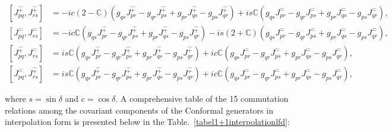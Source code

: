 \documentclass[%
 reprint,
superscriptaddress,
 amsmath,amssymb,
 aps,
]{revtex4-2}
\begin{document}
\begin{widetext}
\begin{center}
\begin{align}
    \left[J^{\hat{+}}_{pq},J^{\hat{+}}_{rs}\right] &=-ic(2-\mathbb{C})\left(g_{{q}{s}}J^{\hat{+}}_{{p}{r}}-g_{{q}{r}}J^{\hat{+}}_{{p}{s}}+g_{{p}{r}}J^{\hat{+}}_{{q}{s}}-g_{{p}{s}}J^{\hat{+}}_{{q}{r}}\right)+is\mathbb{C}\left(g_{{q}{s}}J^{\hat{-}}_{{p}{r}}-g_{{q}{r}}J^{\hat{-}}_{{p}{s}}+g_{{p}{r}}J^{\hat{-}}_{{q}{s}}-g_{{p}{s}}J^{\hat{-}}_{{q}{r}}\right),\\
    \left[J^{\hat{-}}_{pq},J^{\hat{-}}_{rs}\right] &=-ic\mathbb{C}\left(g_{{q}{s}}J^{\hat{+}}_{{p}{r}}-g_{{q}{r}}J^{\hat{+}}_{{p}{s}}+g_{{p}{r}}J^{\hat{+}}_{{q}{s}}-g_{{p}{s}}J^{\hat{+}}_{{q}{r}}\right)-is(2+\mathbb{C})\left(g_{{q}{s}}J^{\hat{-}}_{{p}{r}}-g_{{q}{r}}J^{\hat{-}}_{{p}{s}}+g_{{p}{r}}J^{\hat{-}}_{{q}{s}}-g_{{p}{s}}J^{\hat{-}}_{{q}{r}}\right),\\
    \left[J^{\hat{+}}_{pq},J^{\hat{-}}_{rs}\right] &=is\mathbb{C}\left(g_{{q}{s}}J^{\hat{+}}_{{p}{r}}-g_{{q}{r}}J^{\hat{+}}_{{p}{s}}+g_{{p}{r}}J^{\hat{+}}_{{q}{s}}-g_{{p}{s}}J^{\hat{+}}_{{q}{r}}\right)+ic\mathbb{C}\left(g_{{q}{s}}J^{\hat{-}}_{{p}{r}}-g_{{q}{r}}J^{\hat{-}}_{{p}{s}}+g_{{p}{r}}J^{\hat{-}}_{{q}{s}}-g_{{p}{s}}J^{\hat{-}}_{{q}{r}}\right),\\
    \left[J^{\hat{-}}_{pq},J^{\hat{+}}_{rs}\right] &=is\mathbb{C}\left(g_{{q}{s}}J^{\hat{+}}_{{p}{r}}-g_{{q}{r}}J^{\hat{+}}_{{p}{s}}+g_{{p}{r}}J^{\hat{+}}_{{q}{s}}-g_{{p}{s}}J^{\hat{+}}_{{q}{r}}\right)+ic\mathbb{C}\left(g_{{q}{s}}J^{\hat{-}}_{{p}{r}}-g_{{q}{r}}J^{\hat{-}}_{{p}{s}}+g_{{p}{r}}J^{\hat{-}}_{{q}{s}}-g_{{p}{s}}J^{\hat{-}}_{{q}{r}}\right),
\end{align}
\end{center}
\end{widetext}
where $s=\sin{\delta}$ and $c=\cos{\delta}$. A comprehensive table of the 15 commutation relations among the covariant components of the Conformal generators in interpolation form is presented below in the Table.~\ref{tabel1+1interpolationlfd}:
\end{document}
